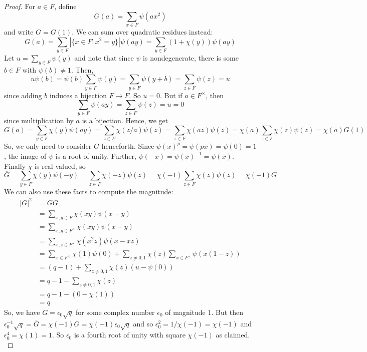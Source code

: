 \begin{proof}
	For $a \in F$, define
	\[ G(a) = \sum_{x \in F} \psi(ax^2) \]
	and write $G = G(1)$. We can sum over quadratic residues instead:
	\[ G(a) = \sum_{y \in F} |\{ x \in F : x^2 = y \}|\psi(ay) = \sum_{y \in F} (1+\chi(y))\psi(ay) \]
	Let $u = \sum_{y \in F} \psi(y)$ and note that since $\psi$ is nondegenerate, there is some $b \in F$ with $\psi(b) \neq 1$. Then,
	\[ u\psi(b) = \psi(b)\sum_{y \in F} \psi(y) = \sum_{y \in F} \psi(y+b) = \sum_{z \in F} \psi(z) = u \]
	since adding $b$ induces a bijection $F \to F$. So $u = 0$. But if $a \in F^\times$, then
	\[ \sum_{y \in F} \psi(ay) = \sum_{z \in F} \psi(z) = u = 0 \]
	since multiplication by $a$ is a bijection. Hence, we get
	\[ G(a) = \sum_{y \in F} \chi(y)\psi(ay) = \sum_{z \in F} \chi(z/a)\psi(z) = \sum_{z \in F} \chi(az)\psi(z) = \chi(a)\sum_{z \in F} \chi(z)\psi(z) = \chi(a)G(1) \]
	So, we only need to consider $G$ henceforth. Since $\psi(x)^p = \psi(px) = \psi(0) = 1$, the image of $\psi$ is a root of unity. Further, $\psi(-x) = \psi(x)^{-1} = \overline{\psi(x)}$. Finally $\chi$ is real-valued, so
	\[ \overline{G} = \sum_{y \in F} \chi(y)\psi(-y) = \sum_{z \in F} \chi(-z)\psi(z) = \chi(-1)\sum_{z \in F} \chi(z)\psi(z) = \chi(-1)G \]
	We can also use these facts to compute the magnitude:
	\begin{align*}
	|G|^2
		&= G\overline{G} \\
		&= \sum_{x,y \in F} \chi(xy)\psi(x-y) \\
		&= \sum_{x,y \in F^\times} \chi(xy)\psi(x-y) \\
		&= \sum_{x,z \in F^\times} \chi(x^2z)\psi(x-xz) \\
		&= \sum_{x \in F^\times} \chi(1)\psi(0) + \sum_{z \neq 0,1} \chi(z)\sum_{x \in F^\times} \psi(x(1-z)) \\
		&= (q-1) + \sum_{z \neq 0,1} \chi(z)(u-\psi(0)) \\
		&= q - 1 - \sum_{z \neq 0,1} \chi(z) \\
		&= q - 1 - (0-\chi(1)) \\
		&= q
	\end{align*}
	So, we have $G = \epsilon_0\sqrt{q}$ for some complex number $\epsilon_0$ of magnitude 1. But then $\epsilon_0^{-1}\sqrt{q} = \overline{G} = \chi(-1)G = \chi(-1)\epsilon_0\sqrt{q}$ and so $\epsilon_0^2 = 1/\chi(-1) = \chi(-1)$ and $\epsilon_0^4 = \chi(1) = 1$. So $\epsilon_0$ is a fourth root of unity with square $\chi(-1)$ as claimed. \\
	

\end{proof}
